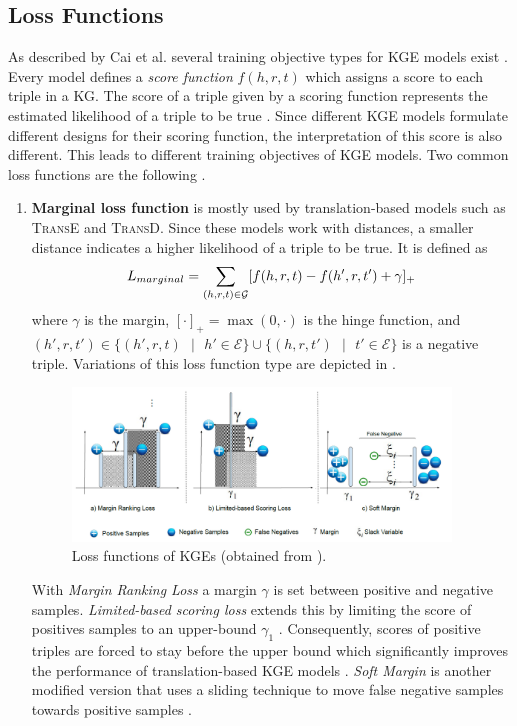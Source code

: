 \subsection{Loss Functions} 
\label{subsec:loss_functions}
%
As described by Cai et al. several training objective types for \ac{KGE} models exist \cite{cai2017kbgan}.
Every model defines a \textit{score function} $f(h,r,t)$ which assigns a score to each triple  in a \ac{KG}.
The score of a triple given by a scoring function represents the estimated likelihood of a triple to be true \cite{cai2017kbgan}.
Since different \ac{KGE} models formulate different designs for their scoring function, the interpretation of this score is also different.
This leads to different training objectives of \ac{KGE} models.
Two common loss functions are the following \cite{cai2017kbgan}.
\begin{enumerate}
    \item 
    \textbf{Marginal loss function} is mostly used by translation-based models such as \textsc{TransE} and \textsc{TransD}.
    Since these models work with distances, a smaller distance indicates a higher likelihood of a triple to be true.
    It is defined as 
    \begin{equation}
        L_{marginal}=\sum_{(h,r,t)\in\mathcal{G}}[f(h,r,t)-f(h',r,t')+\gamma]_+\label{eq:marginalloss}
    \end{equation}
    where $\gamma$ is the margin, $[\cdot]_+=\max(0, \cdot)$ is the hinge function, and $(h',r,t') \in \{(h',r,t)\text{ }|\text{ }h' \in \mathcal{E}\} \cup \{(h,r,t')\text{ }|\text{ }t' \in \mathcal{E}\}$ is a negative triple.
    Variations of this loss function type are depicted in .
    \begin{figure}[t]
      \centering
        \includegraphics[width=0.95\textwidth]{figures/loss_functions.PNG}
      \caption{Loss functions of \acp{KGE} (obtained from \cite{9207513}).}
      \label{fig:loss_functions}
    \end{figure}
    With \textit{Margin Ranking Loss} a margin $\gamma$ is set between positive and negative samples.
    \textit{Limited-based scoring loss} extends this by limiting the score of positives samples to an upper-bound $\gamma_1$ \cite{9207513}.
    Consequently, scores of positive triples are forced to stay before the upper bound which
    significantly improves the performance of translation-based KGE models \cite{9207513}.
    \textit{Soft Margin} is another modified version that uses a sliding technique to move false negative samples towards positive samples \cite{9207513}.     
    

\end{enumerate}
